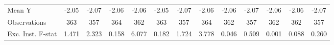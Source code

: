 {\begin{tabular}{l*{12}{c}}
\midrule
Mean Y      &       -2.05         &       -2.07         &       -2.06         &       -2.06         &       -2.05         &       -2.07         &       -2.06         &       -2.06         &       -2.07         &       -2.06         &       -2.06         &       -2.07         \\
Observations&         363         &         357         &         364         &         362         &         363         &         357         &         364         &         362         &         357         &         362         &         362         &         357         \\
Exc. Inst. F-stat&       1.471         &       2.323         &       0.158         &       6.077         &       0.182         &       1.724         &       3.778         &       0.046         &       0.509         &       0.001         &       0.088         &       0.260         \\
\bottomrule
\end{tabular}
}
